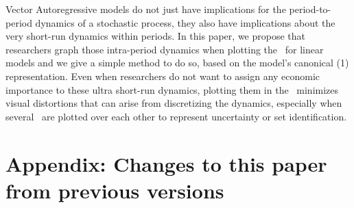 \documentclass[12pt,fleqn]{article}
\begin{document}
Vector Autoregressive models do not just have implications for the
period-to-period dynamics of a stochastic process, they also have
implications about the very short-run dynamics within periods. In this
paper, we propose that researchers graph those intra-period dynamics
when plotting the \IRFs\ for linear models and we give a simple method
to do so, based on the model's canonical \VAR(1) representation. Even
when researchers do not want to assign any economic importance to
these ultra short-run dynamics, plotting them in the \IRFs\ minimizes
visual distortions that can arise from discretizing the dynamics,
especially when several \IRFs\ are plotted over each other to
represent uncertainty or set identification.

\clearpage
{}


\clearpage
\appendix
\section{Appendix: Changes to this paper from previous versions}

\end{document}
